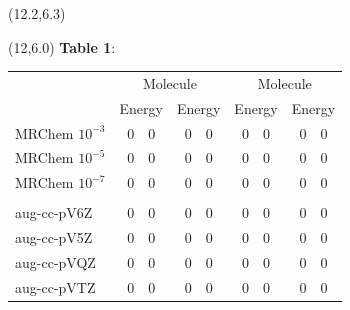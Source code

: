 \documentclass[a0,draft,portrait]{a0poster}
\def\Subhead#1{\noindent{\large\color{DarkBlue} #1}}
\begin{document}
\begin{textblock}{5}(12.2,6.3)
    \Subhead{LDA}
\end{textblock} 
\begin{textblock}{5}(12,6.0)
\footnotesize
\textbf{Table 1}:

\begin{table}
    \normalsize
    \centering
    \begin{tabular}{|l|r@{.}lr@{.}l|r@{.}lr@{.}l|}
	\hline&
	\multicolumn{4}{c|}{Molecule}&\multicolumn{4}{c|}{Molecule}\\
    &	\multicolumn{2}{c}{Energy}&\multicolumn{2}{c|}{Energy}&
	\multicolumn{2}{c}{Energy}&\multicolumn{2}{c|}{Energy}\\
	\hline
	MRChem $10^{-3}$&  0&0& 0&0& 0&0& 0&0\\
	MRChem $10^{-5}$&  0&0& 0&0& 0&0& 0&0\\
	MRChem $10^{-7}$&  0&0& 0&0& 0&0& 0&0\\
    &   \multicolumn{4}{c|}{}&\multicolumn{4}{c|}{}\\
	aug-cc-pV6Z&       0&0& 0&0& 0&0& 0&0\\
	aug-cc-pV5Z&	   0&0& 0&0& 0&0& 0&0\\
	aug-cc-pVQZ&	   0&0& 0&0& 0&0& 0&0\\
	aug-cc-pVTZ&       0&0& 0&0& 0&0& 0&0\\
	\hline
	\end{tabular}
    \end{table}
\end{textblock}
\end{document}
